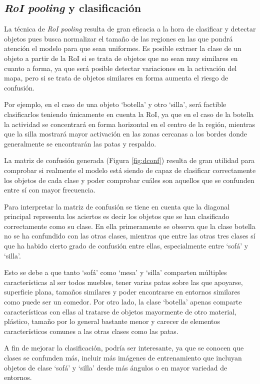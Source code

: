 \subsection {\textit{RoI pooling} y clasificación}
    La técnica de \textit{RoI pooling} resulta de gran eficacia a la hora de clasificar y detectar objetos pues busca normalizar el tamaño de las regiones en las que pondrá atención el modelo para que sean uniformes. Es posible extraer la clase de un objeto a partir de la RoI si se trata de objetos que no sean muy similares en cuanto a forma, ya que será posible detectar variaciones en la activación del mapa, pero si se trata de objetos similares en forma aumenta el riesgo de confusión.

    Por ejemplo, en el caso de una objeto `botella' y otro `silla', será factible clasificarlos teniendo únicamente en cuenta la RoI, ya que en el caso de la botella la actividad se concentrará en forma horizontal en el centro de la región, mientras que la silla mostrará mayor activación en las zonas cercanas a los bordes donde generalmente se encontrarán las patas y respaldo.

    La matriz de confusión generada (Figura \ref{fig:dconf}) resulta de gran utilidad para comprobar si realmente el modelo está siendo de capaz de clasificar correctamente los objetos de cada clase y poder comprobar cuáles son aquellos que se confunden entre sí con mayor frecuencia.


    Para interpretar la matriz de confusión se tiene en cuenta que la diagonal principal representa los aciertos es decir los objetos que se han clasificado correctamente como su clase. En ella primeramente se observa que la clase botella no se ha confundido con las otras clases, mientras que entre las otras tres clases sí que ha habido cierto grado de confusión entre ellas, especialmente entre `sofá' y `silla'.

    Esto se debe a que tanto `sofá' como `mesa' y `silla' comparten múltiples características al ser todos muebles, tener varias patas sobre las que apoyarse, superficie plana, tamaños similares y poder encontrarse en entornos similares como puede ser un comedor. Por otro lado, la clase `botella' apenas comparte características con ellas al tratarse de objetos mayormente de otro material, plástico, tamaño por lo general bastante menor y carecer de elementos característicos comunes a las otras clases como las patas.

    A fin de mejorar la clasificación, podría ser interesante, ya que se conocen que clases se confunden más, incluir más imágenes de entrenamiento que incluyan objetos de clase `sofá' y `silla' desde más ángulos o en mayor variedad de entornos.



